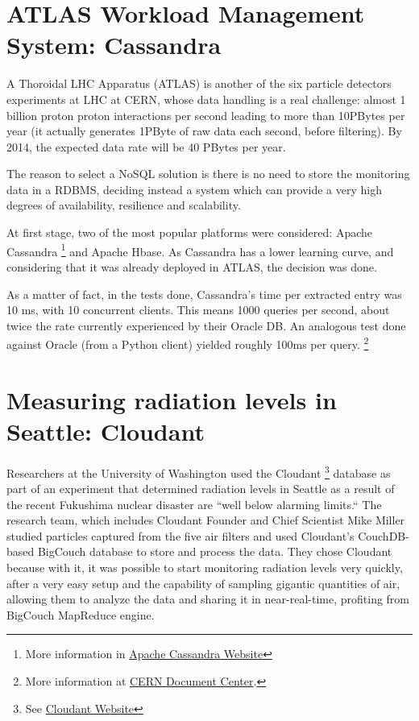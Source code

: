 \section{ATLAS Workload Management System: Cassandra}

A Thoroidal LHC Apparatus (ATLAS) is another of the six particle detectors experiments at LHC at CERN, whose data handling is a real challenge: almost 1 billion proton proton interactions per second leading to more than 10PBytes per year (it actually generates 1PByte of raw data each second, before filtering). By 2014, the expected data rate will be 40 PBytes per year.


The reason to select a NoSQL solution is there is no need to store the monitoring data in a RDBMS, deciding instead a system which can provide a very high degrees of availability, resilience and scalability.

At first stage, two of the most popular platforms were considered: Apache Cassandra \footnote{More information in \href{http://cassandra.apache.org/}{Apache Cassandra Website}} and Apache Hbase. As Cassandra has a lower learning curve, and considering that it was already deployed in ATLAS, the decision was done.

As a matter of fact, in the tests done, Cassandra's time per extracted entry was 10 ms, with 10 concurrent clients. This means 1000 queries per second, about twice the rate currently experienced by their Oracle DB. An analogous test done against Oracle (from a Python client) yielded roughly 100ms per query. \footnote{More information at \href{http://cds.cern.ch/record/1446655/files/ATL-SOFT-PROC-2012-012.pdf}{CERN Document Center}.}


\section{Measuring radiation levels in Seattle: Cloudant}

Researchers at the University of Washington used the Cloudant \footnote{See \href{https://cloudant.com/}{Cloudant Website}} database as part of an experiment that determined radiation levels in Seattle as a result of the recent Fukushima nuclear disaster are ``well below alarming limits.`` The research team, which includes Cloudant Founder and Chief Scientist Mike Miller studied particles captured from the five air filters and used Cloudant’s CouchDB-based BigCouch database to store and process the data. They chose Cloudant because with it, it was possible to start monitoring radiation levels very quickly, after a very easy setup and the capability of sampling gigantic quantities of air, allowing them to analyze the data and sharing it in near-real-time, profiting from BigCouch MapReduce engine.
